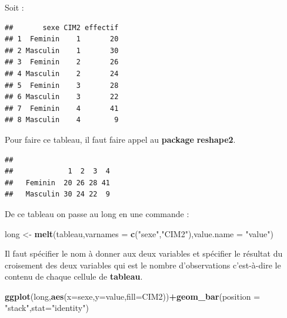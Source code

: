 \documentclass[
]{book}
\newenvironment{Shaded}{\begin{snugshade}}{\end{snugshade}}
\newcommand{\AttributeTok}[1]{\textcolor[rgb]{0.13,0.29,0.53}{#1}}
\newcommand{\FunctionTok}[1]{\textcolor[rgb]{0.13,0.29,0.53}{\textbf{#1}}}
\newcommand{\NormalTok}[1]{#1}
\newcommand{\OtherTok}[1]{\textcolor[rgb]{0.56,0.35,0.01}{#1}}
\newcommand{\SpecialCharTok}[1]{\textcolor[rgb]{0.81,0.36,0.00}{\textbf{#1}}}
\newcommand{\StringTok}[1]{\textcolor[rgb]{0.31,0.60,0.02}{#1}}
\begin{document}
Soit :

\begin{verbatim}
##       sexe CIM2 effectif
## 1  Feminin    1       20
## 2 Masculin    1       30
## 3  Feminin    2       26
## 4 Masculin    2       24
## 5  Feminin    3       28
## 6 Masculin    3       22
## 7  Feminin    4       41
## 8 Masculin    4        9
\end{verbatim}

Pour faire ce tableau, il faut faire appel au \textbf{package} \textbf{reshape2}.

\begin{Shaded}
\end{Shaded}

\begin{verbatim}
##           
##             1  2  3  4
##   Feminin  20 26 28 41
##   Masculin 30 24 22  9
\end{verbatim}

De ce tableau on passe au long en une commande :

\begin{Shaded}
\begin{Highlighting}[]
\NormalTok{long }\OtherTok{\textless{}{-}} \FunctionTok{melt}\NormalTok{(tableau,}\AttributeTok{varnames =} \FunctionTok{c}\NormalTok{(}\StringTok{"sexe"}\NormalTok{,}\StringTok{"CIM2"}\NormalTok{),}\AttributeTok{value.name =} \StringTok{"value"}\NormalTok{)}
\end{Highlighting}
\end{Shaded}

Il faut spécifier le nom à donner aux deux variables et spécifier le résultat
du croisement des deux variables qui est le nombre d'observations c'est-à-dire
le contenu de chaque cellule de \textbf{tableau}.

\begin{Shaded}
\begin{Highlighting}[]
\FunctionTok{ggplot}\NormalTok{(long,}\FunctionTok{aes}\NormalTok{(}\AttributeTok{x=}\NormalTok{sexe,}\AttributeTok{y=}\NormalTok{value,}\AttributeTok{fill=}\NormalTok{CIM2))}\SpecialCharTok{+}\FunctionTok{geom\_bar}\NormalTok{(}\AttributeTok{position =} \StringTok{"stack"}\NormalTok{,}\AttributeTok{stat=}\StringTok{"identity"}\NormalTok{)}
\end{Highlighting}
\end{Shaded}
\end{document}

